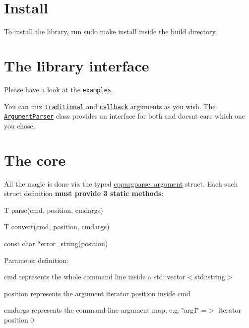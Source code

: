 \section*{Install}

To install the library, run {\ttfamily sudo make install} inside the build directory.

\section*{The library interface}

Please have a look at the \href{https://github.com/backraw/cppargparse/tree/master/samples}{\tt examples}.

You can mix \href{https://github.com/backraw/cppargparse/tree/master/samples/traditional}{\tt traditional} and \href{https://github.com/backraw/cppargparse/tree/master/samples/callback}{\tt callback} arguments as you wish. The \href{https://github.com/backraw/cppargparse/blob/master/include/cppargparse/parser.h}{\tt Argument\+Parser} class provides an interface for both and doesn\textquotesingle{}t care which one you chose.

\section*{The core}

All the magic is done via the typed {\ttfamily \hyperlink{structcppargparse_1_1argument}{cppargparse\+::argument}} struct. Each such struct definition {\bfseries must provide 3 static methods}\+:
\begin{DoxyItemize}
\item {\ttfamily T parse(cmd, position, cmdargs)}
\item {\ttfamily T convert(cmd, position, cmdargs)}
\item {\ttfamily const char $\ast$error\+\_\+string(position)}
\end{DoxyItemize}

Parameter definition\+:
\begin{DoxyItemize}
\item {\ttfamily cmd} represents the whole command line inside a {\ttfamily std\+::vector$<$std\+::string$>$}
\item {\ttfamily position} represents the argument iterator position inside {\ttfamily cmd}
\item {\ttfamily cmdargs} represents the command line argument map, e.\+g. {\ttfamily \char`\"{}arg1\char`\"{} =$>$ iterator position 0}
\end{DoxyItemize}

